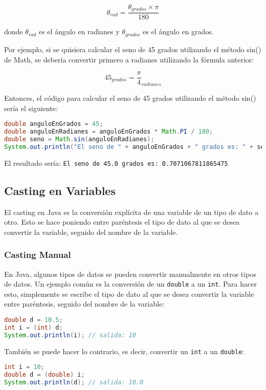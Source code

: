 \documentclass{article}
\begin{document}
$$\theta_{rad} = \frac{\theta_{grados} \times \pi}{180}$$

donde $\theta_{rad}$ es el ángulo en radianes y $\theta_{grados}$ es el ángulo en grados.

Por ejemplo, si se quisiera calcular el seno de 45 grados utilizando el método sin() de Math, se debería convertir primero a radianes utilizando la fórmula anterior:

$$45_{grados} = \frac{\pi}{4}_{radianes}$$

Entonces, el código para calcular el seno de 45 grados utilizando el método sin() sería el siguiente:

\begin{lstlisting}[language=Java]
double anguloEnGrados = 45;
double anguloEnRadianes = anguloEnGrados * Math.PI / 180;
double seno = Math.sin(anguloEnRadianes);
System.out.println("El seno de " + anguloEnGrados + " grados es: " + seno);
\end{lstlisting}
El resultado sería: \lstinline{El seno de 45.0 grados es: 0.7071067811865475}

\subsection{Casting en Variables}

El casting en Java es la conversión explícita de una variable de un tipo de dato a otro. Esto se hace poniendo entre paréntesis el tipo de dato al que se desea convertir la variable, seguido del nombre de la variable.

\subsubsection{Casting Manual}

En Java, algunos tipos de datos se pueden convertir manualmente en otros tipos de datos. Un ejemplo común es la conversión de un \texttt{double} a un \texttt{int}. Para hacer esto, simplemente se escribe el tipo de dato al que se desea convertir la variable entre paréntesis, seguido del nombre de la variable:

\begin{lstlisting}[language=Java]
double d = 10.5;
int i = (int) d;
System.out.println(i); // salida: 10
\end{lstlisting}

También se puede hacer lo contrario, es decir, convertir un \texttt{int} a un \texttt{double}:

\begin{lstlisting}[language=Java]
int i = 10;
double d = (double) i;
System.out.println(d); // salida: 10.0
\end{lstlisting}
\end{document}

